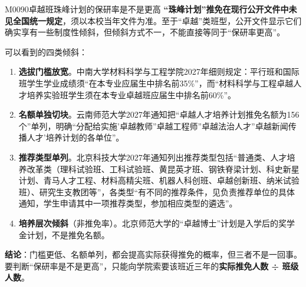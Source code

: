 \begin{qa}{M0090}{卓越班珠峰计划的保研率是不是更高}
\textbf{“珠峰计划”推免在现行公开文件中未见全国统一规定}，须以本校当年文件为准。至于“卓越”类班型，公开文件显示它们确实享有一些制度性倾斜，但倾斜方式不一，不能直接等同于“保研率更高”。

可以看到的四类倾斜：

\begin{enumerate}
  \item \textbf{选拔门槛放宽}。中南大学材料科学与工程学院2027年细则规定：平行班和国际班学生学业成绩须“在本专业应届生中排名前35\%”，而“材料科学与工程卓越人才培养实验班学生须在本专业卓越班应届生中排名前60\%”。
  \item \textbf{名额单独切块}。云南师范大学2027年通知把“卓越人才培养计划推免名额为156个”单列，明确“分配给实施'卓越教师''卓越工程师''卓越法治人才''卓越新闻传播人才'培养计划的各单位”。
  \item \textbf{推荐类型单列}。北京科技大学2027年通知列出推荐类型包括“普通类、人才培养改革类（理科试验班、工科试验班、黄昆英才班、钢铁脊梁计划、科史新星计划、青马人才工程、材料高精尖班、机器人科创班、卓越创新班、纳米试验班）、研究生支教团等”，各类型“有不同的推荐条件，见负责推荐单位的具体通知，学生申请其中一项推荐类型，参加相应类型的遴选”。
  \item \textbf{培养层次倾斜}（非推免率）。北京师范大学的“卓越博士”计划是入学后的奖学金计划，不是推免名额。
\end{enumerate}

\textbf{结论}：门槛更低、名额单列，都会提高实际获得推免的概率，但三者不是一回事。要判断“保研率是不是更高”，只能向学院索要该班近三年的\textbf{实际推免人数 ÷ 班级人数}。
\end{qa}

